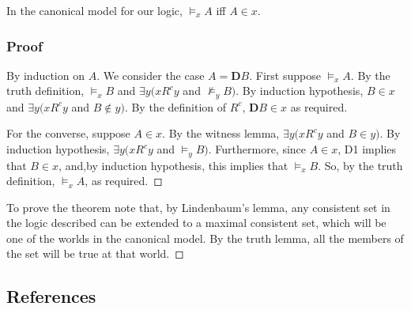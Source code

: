 \documentclass[
  11pt,
  letterpaper,
  DIV=11,
  numbers=noendperiod,
  twoside]{scrartcl}
\begin{document}
In the canonical model for our logic, \(\models _x A\) iff \(A{\in}x\).

\subsubsection*{Proof}\label{proof-9}

By induction on \(A\). We consider the case \(A=\mathbf{D}B\). First
suppose \(\models _x A\). By the truth definition, \(\models _x B\) and
\(\exists y (xR^cy\) and \({\nvDash_y}B)\). By induction hypothesis,
\(B{\in}x\) and \(\exists y (xR^cy\) and \(B{\notin}y)\). By the
definition of \(R^c\), \(\mathbf{D}B{\in}x\) as required.

For the converse, suppose \(A{\in}x\). By the witness lemma,
\(\exists y (xR^cy\) and \(B{\in}y)\). By induction hypothesis,
\(\exists y( xR^cy\) and \({\models_y}B)\). Furthermore, since
\(A{\in}x\), D1 implies that \(B{\in}x\), and,by induction hypothesis,
this implies that \(\models _x B\). So, by the truth definition,
\(\models _x A\), as required.~◻

To prove the theorem note that, by Lindenbaum's lemma, any consistent
set in the logic described can be extended to a maximal consistent set,
which will be one of the worlds in the canonical model. By the truth
lemma, all the members of the set will be true at that world.~◻

\subsection*{References}\label{references}
\end{document}
